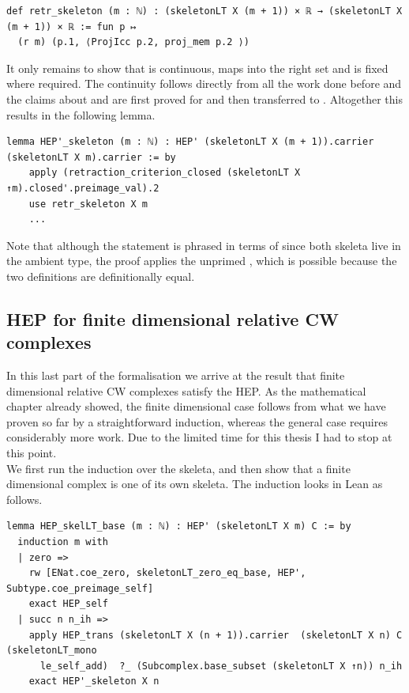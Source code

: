 \documentclass[11pt, a4paper, english]{article}
\theoremstyle{plain}
\theoremstyle{definition}
\theoremstyle{remark}
\numberwithin{equation}{section}
\numberwithin{theorem}{section}
\begin{document}
\begin{verbatim}
def retr_skeleton (m : ℕ) : (skeletonLT X (m + 1)) × ℝ → (skeletonLT X (m + 1)) × ℝ := fun p ↦
  (r m) (p.1, ⟨ProjIcc p.2, proj_mem p.2 ⟩)
\end{verbatim}

It only remains to show that  is continuous, maps into the right set and is fixed where required. The continuity follows directly from all the work done before and the claims about  and  are first proved for  and then transferred to . 
Altogether this results in the following lemma. 

\begin{verbatim}
lemma HEP'_skeleton (m : ℕ) : HEP' (skeletonLT X (m + 1)).carrier (skeletonLT X m).carrier := by
    apply (retraction_criterion_closed (skeletonLT X ↑m).closed'.preimage_val).2
    use retr_skeleton X m
    ...
\end{verbatim}

Note that although the statement is phrased in terms of  since both skeleta live in the ambient type, the proof applies the unprimed , which is possible because the two definitions are definitionally equal. 

\subsection{HEP for finite dimensional relative CW complexes} \label{subsec:lean:relCW}
In this last part of the formalisation we arrive at the result that finite dimensional relative CW complexes satisfy the HEP. As the mathematical chapter already showed, the finite dimensional case follows from what we have proven so far by a straightforward induction, whereas the general case requires considerably more work. Due to the limited time for this thesis I had to stop at this point. \\
We first run the induction over the skeleta, and then show that a finite dimensional complex is one of its own skeleta. The induction looks in Lean as follows.

\begin{verbatim}
lemma HEP_skelLT_base (m : ℕ) : HEP' (skeletonLT X m) C := by
  induction m with
  | zero =>
    rw [ENat.coe_zero, skeletonLT_zero_eq_base, HEP', Subtype.coe_preimage_self]
    exact HEP_self
  | succ n n_ih =>
    apply HEP_trans (skeletonLT X (n + 1)).carrier  (skeletonLT X n) C (skeletonLT_mono
      le_self_add)  ?_ (Subcomplex.base_subset (skeletonLT X ↑n)) n_ih
    exact HEP'_skeleton X n
\end{verbatim}
\end{document}
